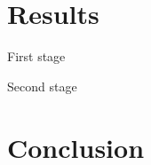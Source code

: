 \documentclass[
  ignorenonframetext,
]{beamer}
\begin{document}
\hypertarget{results}{%
\section{Results}\label{results}}

\begin{frame}{First stage}
\protect\hypertarget{first-stage}{}

\end{frame}

\begin{frame}{Second stage}
\protect\hypertarget{second-stage}{}

\end{frame}

\hypertarget{conclusion}{%
\section{Conclusion}\label{conclusion}}
\end{document}
